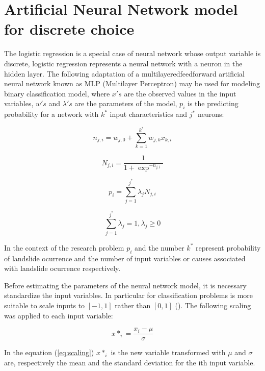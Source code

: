 \documentclass[11pt,twoside]{rmta2010esp}%
\begin{document}
\section{Artificial Neural Network model for discrete choice}
The logistic regression is a special case of neural network whose output variable is
discrete, logistic regression represents a neural network with 
a neuron in the hidden layer. The following adaptation of a multilayeredfeedforward artificial neural network known as  
MLP (Multilayer Perceptron) may be used for modeling binary classification model, where $x's$ are the observed values in the input variables, $w's$ and $\lambda's$ are the parameters of the model, $ p_{i} $ is the predicting probability for a network with $ k^{*} $ input characteristics and $ j^{*} $ neurons: 

\begin{equation}
n_{j,i} = w_{j,0} + \sum_{k=1}^{k^{*}} w_{j,k}x_{k,i}
\end{equation}

\begin{equation}
N_{j,i} = \frac{1}{1+\exp^{-n_{j,i}}}
\end{equation}



\begin{equation}
p_{i} = \sum_{j=1}^{j^{*}} \lambda_{j} N_{j,i}
\end{equation}

\begin{equation}
\sum_{j=1}^{j^{*}} \lambda_{j} = 1 , \lambda_{j} \ge 0
\end{equation}



In the context of the research problem $p_{i} $ and the number $ k^{*} $ represent 
probability of landslide ocurrence and the number of input variables or causes associated with landslide ocurrence respectively.

Before estimating the parameters of the neural network model, it is necessary standardize the input variables. In particular for classification problems is more suitable to scale inputs to $[-1,1]$ rather than $[0,1]$ (\cite{FAQANN}). The following scaling was applied to each input variable: 

\begin{equation}
x*_{i} = \frac{x_{i} - \mu }{\sigma}
\label{eq:scaling}
\end{equation}

In the equation (\ref{eq:scaling}) $x*_{i}$ is the new variable transformed with $ \mu $ and $\sigma$ are, respectively the mean and the standard deviation for the ith input variable.  
\end{document}

